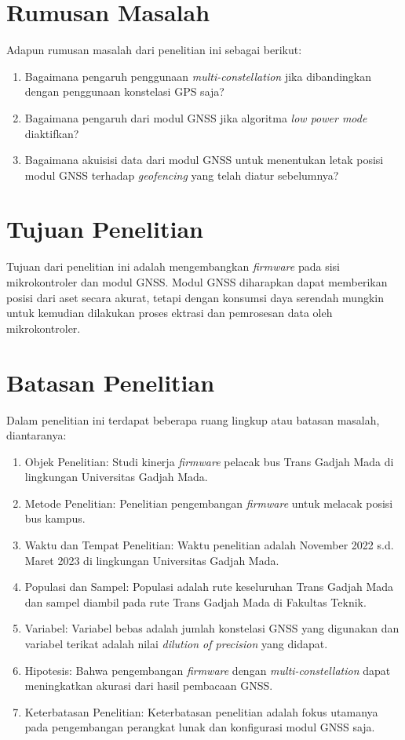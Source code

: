 \section{Rumusan Masalah}
Adapun rumusan masalah dari penelitian ini sebagai berikut:
\begin{enumerate}
	\item Bagaimana pengaruh penggunaan \textit{multi-constellation} jika dibandingkan dengan penggunaan konstelasi GPS saja?
	\item Bagaimana pengaruh dari modul GNSS jika algoritma \textit{low power mode} diaktifkan?
	\item Bagaimana akuisisi data dari modul GNSS untuk menentukan letak posisi modul GNSS terhadap \textit{geofencing} yang telah diatur sebelumnya?
\end{enumerate}

\section{Tujuan Penelitian}
Tujuan dari penelitian ini adalah mengembangkan \textit{firmware} pada sisi mikrokontroler dan modul GNSS. Modul GNSS diharapkan dapat memberikan posisi dari aset secara akurat, tetapi dengan konsumsi daya serendah mungkin untuk kemudian dilakukan proses ektrasi dan pemrosesan data oleh mikrokontroler.

\section{Batasan Penelitian}
Dalam penelitian ini terdapat beberapa ruang lingkup atau batasan masalah, diantaranya:
\begin{enumerate}
	\item Objek Penelitian: Studi kinerja \textit{firmware} pelacak bus Trans Gadjah Mada di lingkungan Universitas Gadjah Mada.
	\item Metode Penelitian: Penelitian pengembangan \textit{firmware} untuk melacak posisi bus kampus.
	\item Waktu dan Tempat Penelitian: Waktu penelitian adalah November 2022 s.d. Maret 2023 di lingkungan Universitas Gadjah Mada.
	\item Populasi dan Sampel: Populasi adalah rute keseluruhan Trans Gadjah Mada dan sampel diambil pada rute Trans Gadjah Mada di Fakultas Teknik.
	\item Variabel: Variabel bebas adalah jumlah konstelasi GNSS yang digunakan dan variabel terikat adalah nilai \textit{dilution of precision} yang didapat.
	\item Hipotesis: Bahwa pengembangan \textit{firmware} dengan \textit{multi-constellation} dapat meningkatkan akurasi dari hasil pembacaan GNSS.
	\item Keterbatasan Penelitian: Keterbatasan penelitian adalah fokus utamanya pada pengembangan perangkat lunak dan konfigurasi modul GNSS saja.
\end{enumerate}

